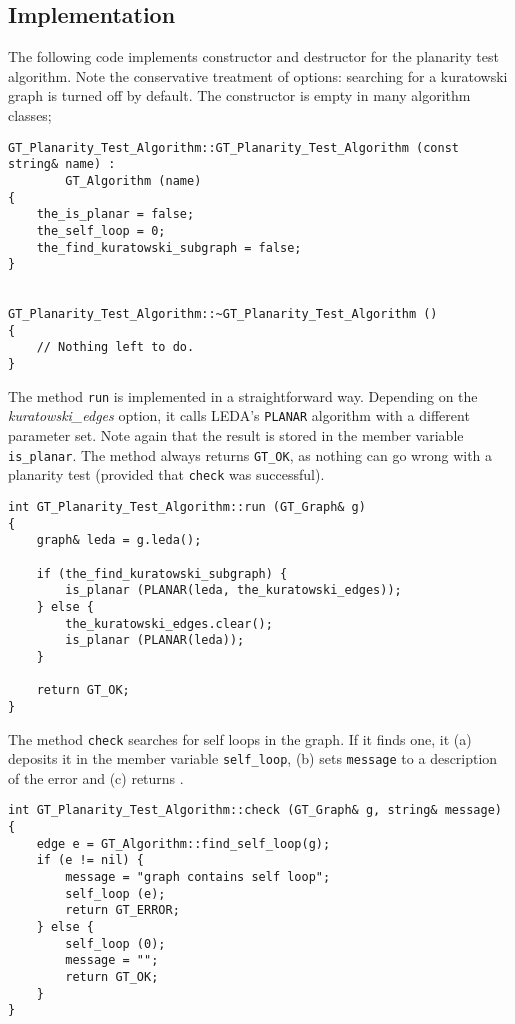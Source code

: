 \documentclass[twoside,fleqn]{report}
\begin{document}
\subsection{Implementation}
\label{s:Algorithm:Example:Implementation}

The following code implements constructor and destructor for the
planarity test algorithm. Note the conservative treatment of
options: searching for a kuratowski graph is turned off by
default. The constructor is empty in many algorithm classes; 

\begin{verbatim}
GT_Planarity_Test_Algorithm::GT_Planarity_Test_Algorithm (const string& name) :
        GT_Algorithm (name)
{
    the_is_planar = false;
    the_self_loop = 0;
    the_find_kuratowski_subgraph = false;
}


GT_Planarity_Test_Algorithm::~GT_Planarity_Test_Algorithm ()
{
    // Nothing left to do.
}
\end{verbatim}

\noindent The method \texttt{run} is implemented in a straightforward way.
Depending on the \emph{kuratowski\_edges} option, it calls LEDA's
\texttt{PLANAR} algorithm with a different parameter set. Note
again that the result is stored in the member variable
\texttt{is\_planar}. The method always returns \texttt{GT\_OK},
as nothing can go wrong with a planarity test (provided that
\texttt{check} was successful).

\begin{verbatim}
int GT_Planarity_Test_Algorithm::run (GT_Graph& g)
{
    graph& leda = g.leda();

    if (the_find_kuratowski_subgraph) {
        is_planar (PLANAR(leda, the_kuratowski_edges));
    } else {
        the_kuratowski_edges.clear();
        is_planar (PLANAR(leda));
    }

    return GT_OK;
}
\end{verbatim}  


\noindent The method \texttt{check} searches for self loops in the graph.
If it finds one, it (a) deposits it in the member variable
\texttt{self\_loop}, (b) sets \texttt{message} to a description
of the error and (c) returns .

\begin{verbatim}
int GT_Planarity_Test_Algorithm::check (GT_Graph& g, string& message)
{
    edge e = GT_Algorithm::find_self_loop(g);
    if (e != nil) {
        message = "graph contains self loop";
        self_loop (e);
        return GT_ERROR;
    } else {
        self_loop (0);
        message = "";
        return GT_OK;
    }
}
\end{verbatim}
\end{document}
